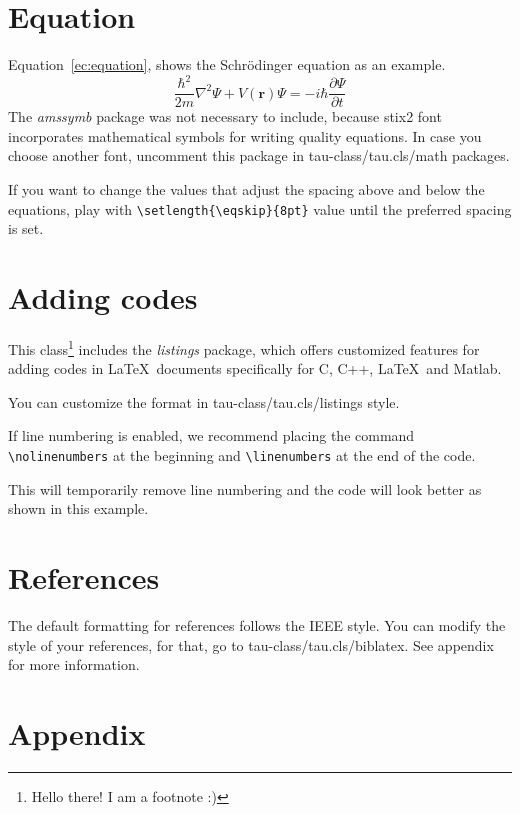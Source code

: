 \documentclass[9pt,a4paper,twoside]{tau-class/tau}
\begin{document}
\section{Equation}

    Equation~\ref{ec:equation}, shows the Schrödinger equation as an example. 
	\begin{equation} \label{ec:equation}
		\frac{\hbar^2}{2m}\nabla^2\Psi + V(\mathbf{r})\Psi = -i\hbar \frac{\partial\Psi}{\partial t}
	\end{equation} 
    The \textit{amssymb} package was not necessary to include, because stix2 font incorporates mathematical symbols for writing quality equations. In case you choose another font, uncomment this package in tau-class/tau.cls/math packages.
	
    If you want to change the values that adjust the spacing above and below the equations, play with \verb|\setlength{\eqskip}{8pt}| value until the preferred spacing is set.
	
\section{Adding codes}
	
    This class\footnote{Hello there! I am a footnote :)} includes the \textit{listings} package, which offers customized features for adding codes in \LaTeX\ documents specifically for C, C++, \LaTeX\ and Matlab. 
	
    You can customize the format in tau-class/tau.cls/listings style.
	
	\nolinenumbers
	
	\linenumbers
	
    If line numbering is enabled, we recommend placing the command \verb|\nolinenumbers| at the beginning and \verb|\linenumbers| at the end of the code. 
	
    This will temporarily remove line numbering and the code will look better as shown in this example.
	
\section{References}

    The default formatting for references follows the IEEE style. 
    You can modify the style of your references, for that, go to tau-class/tau.cls/biblatex. 
    See appendix for more information.
	
\section{Appendix}
\end{document}
